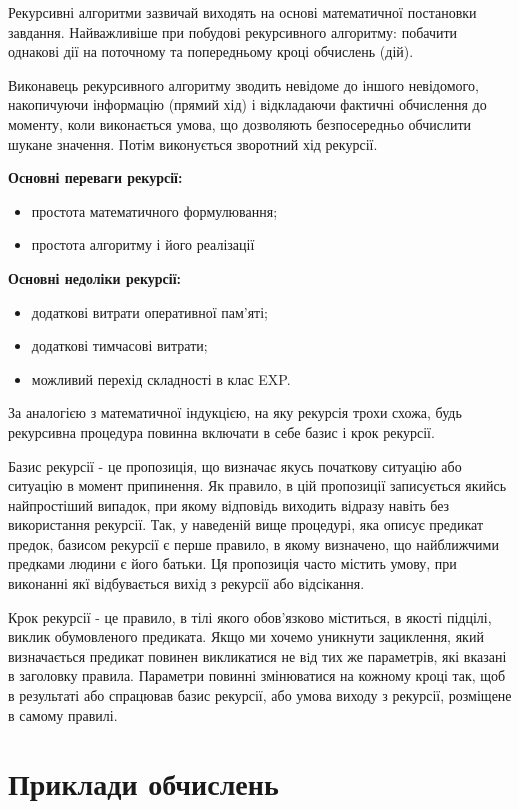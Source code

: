 Рекурсивні алгоритми зазвичай виходять на основі математичної постановки завдання. Найважливіше при побудові рекурсивного алгоритму: побачити однакові дії на поточному та попередньому кроці обчислень (дій).

Виконавець рекурсивного алгоритму зводить невідоме до іншого невідомого, накопичуючи інформацію (прямий хід) і відкладаючи фактичні обчислення до моменту, коли виконається умова, що дозволяють безпосередньо обчислити шукане значення. Потім виконується зворотний хід рекурсії.

\textbf{Основні переваги рекурсії:}
\begin{itemize}
\item простота математичного формулювання;
\item простота алгоритму і його реалізації
\end{itemize}
\textbf{Основні недоліки рекурсії:}
\begin{itemize}
\item додаткові витрати оперативної пам'яті;
\item додаткові тимчасові витрати;
\item можливий перехід складності в клас EXP.
\end{itemize}

За аналогією з математичної індукцією, на яку рекурсія трохи схожа, будь рекурсивна процедура повинна включати в себе базис і крок рекурсії.

Базис рекурсії - це пропозиція, що визначає якусь початкову ситуацію або ситуацію в момент припинення. Як правило, в цій пропозиції записується якийсь найпростіший випадок, при якому відповідь виходить відразу навіть без використання рекурсії. Так, у наведеній вище процедурі, яка описує предикат предок, базисом рекурсії є перше правило, в якому визначено, що найближчими предками людини є його батьки. Ця пропозиція часто містить умову, при виконанні якї відбувається вихід з рекурсії або відсікання.

Крок рекурсії - це правило, в тілі якого обов'язково міститься, в якості підцілі, виклик обумовленого предиката. Якщо ми хочемо уникнути зациклення, який визначається предикат повинен викликатися не вiд тих же параметрів, які вказані в заголовку правила. Параметри повинні змінюватися на кожному кроці так, щоб в результаті або спрацював базис рекурсії, або умова виходу з рекурсії, розміщене в самому правилі.

\section{Приклади обчислень}
\nopagebreak[4]


